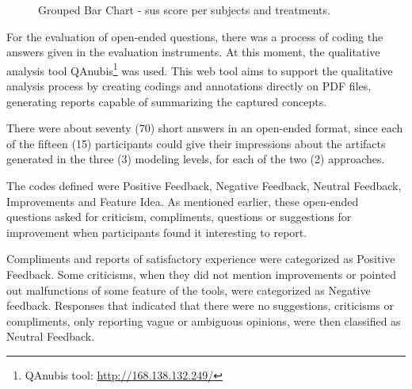 \begin{figure}[!htb]
    \centering
    \caption{Grouped Bar Chart - \ac{sus} score per subjects and treatments.}
    \label{fig:GroupedBarSUS_tools}
    
\end{figure}

For the evaluation of open-ended questions, there was a process of coding the answers given in the evaluation instruments.
At this moment, the qualitative analysis tool QAnubis\footnote{QAnubis tool: \url{http://168.138.132.249/}} was used.
This web tool aims to support the qualitative analysis process by creating codings and annotations directly on PDF files, generating reports capable of summarizing the captured concepts.

There were about seventy (70) short answers in an open-ended format, since each of the fifteen (15) participants could give their impressions about the artifacts generated in the three (3) modeling levels, for each of the two (2) approaches.

The codes defined were Positive Feedback, Negative Feedback, Neutral Feedback, Improvements and Feature Idea.
As mentioned earlier, these open-ended questions asked for criticism, compliments, questions or suggestions for improvement when participants found it interesting to report.

Compliments and reports of satisfactory experience were categorized as Positive Feedback.
Some criticisms, when they did not mention improvements or pointed out malfunctions of some feature of the tools, were categorized as Negative feedback.
Responses that indicated that there were no suggestions, criticisms or compliments, only reporting vague or ambiguous opinions, were then classified as Neutral Feedback.

